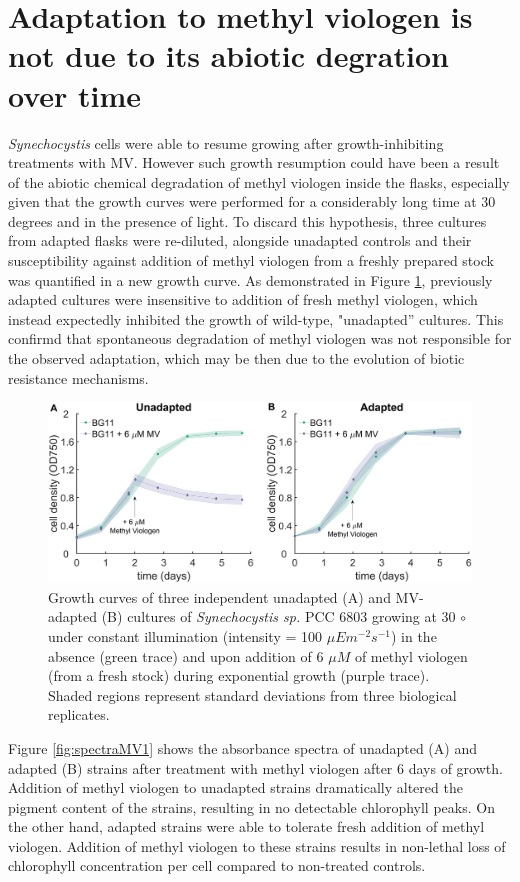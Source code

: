 \documentclass[12pt]{article}
\begin{document}
\section{Adaptation to methyl viologen is not due to its abiotic degration over time}
\textit{Synechocystis} cells were able to resume growing after growth-inhibiting treatments with MV. However such growth resumption could have been a result of the abiotic chemical degradation of methyl viologen inside the flasks, especially given that the growth curves were performed for a considerably long time at 30 degrees and in the presence of light. To discard this hypothesis, three cultures from adapted flasks were re-diluted, alongside unadapted controls and their susceptibility against addition of methyl viologen from a freshly prepared stock was quantified in a new growth curve. As demonstrated in Figure \ref{fig:freshstock}, previously adapted cultures were insensitive to addition of fresh methyl viologen, which instead expectedly inhibited the growth of wild-type, "unadapted'' cultures. This confirmd that spontaneous degradation of methyl viologen was not responsible for the observed adaptation, which may be then due to the evolution of biotic resistance mechanisms. 

\begin{figure}[H]
    \centering
    \includegraphics[width=\hsize]{../Figures/MV_adaptation/growth_curves_firstevolution_Wt_6umMV.png}
    \caption{Growth curves of three independent unadapted (A) and MV-adapted (B) cultures of \textit{Synechocystis sp.} PCC 6803 growing at 30 $\circ$ under constant illumination (intensity = 100 $\mu Em^{-2}s^{-1}$) in the absence (green trace) and upon addition of 6 $\mu M$ of methyl viologen (from a fresh stock) during exponential growth (purple trace). Shaded regions represent standard deviations from three biological replicates.}
    \label{fig:freshstock}
\end{figure}

Figure \ref{fig:spectraMV1} shows the absorbance spectra of unadapted (A) and adapted (B) strains after treatment with methyl viologen after 6 days of growth. Addition of methyl viologen to unadapted strains dramatically altered the pigment content of the strains, resulting in no detectable chlorophyll peaks. On the other hand, adapted strains were able to tolerate fresh addition of methyl viologen. Addition of methyl viologen to these strains results in non-lethal loss of chlorophyll concentration per cell compared to non-treated controls. 
\end{document}
